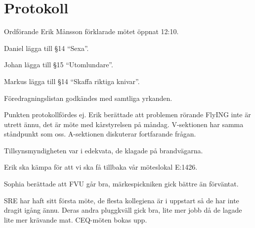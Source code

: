 \documentclass[10pt]{article}
\def\mo{Erik Månsson}
\begin{document}
\section*{Protokoll}
\begin{paragrafer}
Ordförande {\mo} förklarade mötet öppnat 12:10.

{\valavmo}

{\valavms}

{\valavj}

{\tosg}

{\ingaadj}


Daniel \ypa lägga till \S14 ``Sexa''.

Johan \ypa lägga till \S15 ``Utomlundare''.

Markus \ypa lägga till \S14 ``Skaffa riktiga knivar''.

Föredragningslistan godkändes med samtliga yrkanden.

{}
\begin{fyllnadsval} %
\end{fyllnadsval}
\begin{paragrafer}
Punkten protokollfördes ej.
Erik berättade att problemen rörande FlyING inte är utrett ännu, det är möte med kårstyrelsen på måndag. V-sektionen har samma ståndpunkt som oss. A-sektionen diskuterar fortfarande frågan.

Tillsynsmyndigheten var i edekvata, de klagade på brandvägarna.

Erik ska kämpa för att vi ska få tillbaka vår möteslokal E:1426.

Sophia berättade att FVU går bra, märkespickniken gick bättre än förväntat.

SRE har haft sitt första möte, de flesta kollegiena är i uppstart så de har inte dragit igång ännu. Deras andra pluggkväll gick bra, lite mer jobb då de lagade lite mer krävande mat. CEQ-möten bokas upp.


\end{paragrafer}
\end{paragrafer}
\end{document}

